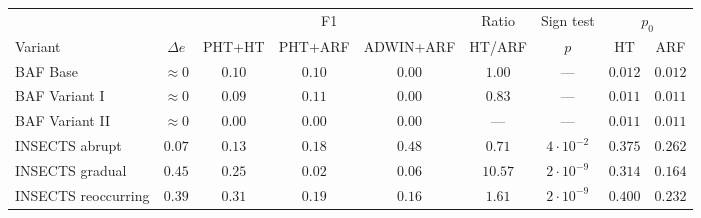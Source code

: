 \begin{tabular}{@{}lcccccccc@{}}
\toprule
 & & \multicolumn{3}{c}{F1} & Ratio & Sign test & \multicolumn{2}{c}{$p_0$} \\
\cmidrule(lr){3-5}\cmidrule(lr){8-9}
Variant & $\Delta e$ & PHT+HT & PHT+ARF & ADWIN+ARF & HT/ARF & $p$ & HT & ARF \\
\midrule
BAF Base & $\approx 0$ & $0.10$ & $0.10$ & $0.00$ & $1.00$ & --- & $0.012$ & $0.012$ \\
BAF Variant I & $\approx 0$ & $0.09$ & $0.11$ & $0.00$ & $0.83$ & --- & $0.011$ & $0.011$ \\
BAF Variant II & $\approx 0$ & $0.00$ & $0.00$ & $0.00$ & --- & --- & $0.011$ & $0.011$ \\
INSECTS abrupt & $0.07$ & $0.13$ & $0.18$ & $0.48$ & $0.71$ & $4 \cdot 10^{-2}$ & $0.375$ & $0.262$ \\
INSECTS gradual & $0.45$ & $0.25$ & $0.02$ & $0.06$ & $10.57$ & $2 \cdot 10^{-9}$ & $0.314$ & $0.164$ \\
INSECTS reoccurring & $0.39$ & $0.31$ & $0.19$ & $0.16$ & $1.61$ & $2 \cdot 10^{-9}$ & $0.400$ & $0.232$ \\
\bottomrule
\end{tabular}
